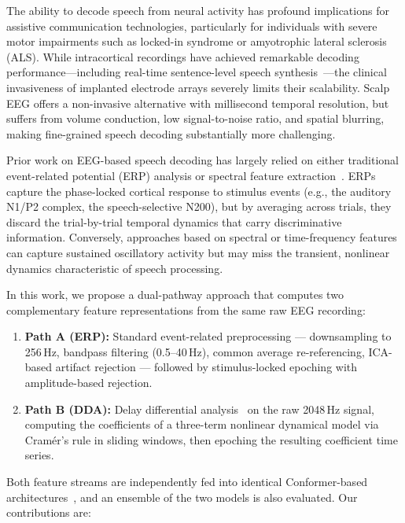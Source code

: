 \documentclass[11pt,a4paper]{article}
\begin{document}
The ability to decode speech from neural activity has profound implications
for assistive communication technologies, particularly for individuals with
severe motor impairments such as locked-in syndrome or amyotrophic lateral
sclerosis (ALS). While intracortical recordings have achieved remarkable
decoding performance---including real-time sentence-level speech
synthesis~\cite{doi:10.1056/NEJMoa2314132,willett2023,metzger2023}---the clinical invasiveness of
implanted electrode arrays severely limits their scalability. Scalp EEG
offers a non-invasive alternative with millisecond temporal resolution, but
suffers from volume conduction, low signal-to-noise ratio, and spatial
blurring, making fine-grained speech decoding substantially more challenging.

Prior work on EEG-based speech decoding has largely relied on either
traditional event-related potential (ERP) analysis or spectral feature
extraction~\cite{defossez2023,anumanchipalli2019}. ERPs capture the
phase-locked cortical response to stimulus events (e.g., the auditory
N1/P2 complex, the speech-selective N200), but by averaging across trials,
they discard the trial-by-trial temporal dynamics that carry discriminative
information. Conversely, approaches based on spectral or time-frequency
features can capture sustained oscillatory activity but may miss the
transient, nonlinear dynamics characteristic of speech processing.

In this work, we propose a dual-pathway approach that computes two
complementary feature representations from the same raw EEG recording:

\begin{enumerate}
  \item \textbf{Path A (ERP):} Standard event-related preprocessing ---
    downsampling to 256\,Hz, bandpass filtering (0.5--40\,Hz), common average
    re-referencing, ICA-based artifact rejection --- followed by
    stimulus-locked epoching with amplitude-based rejection.
  \item \textbf{Path B (DDA):} Delay differential analysis~\cite{lainscsek2015}
    on the raw 2048\,Hz signal, computing the coefficients of a three-term
    nonlinear dynamical model via Cram\'er's rule in sliding windows, then
    epoching the resulting coefficient time series.
\end{enumerate}

Both feature streams are independently fed into identical Conformer-based
architectures~\cite{gulati2020}, and an ensemble of the two models is also
evaluated. Our contributions are:
\end{document}
